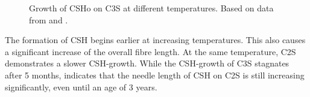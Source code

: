 \begin{figure}[!htb]
    \caption{Growth of \ac{CSHo} on \ac{C3S} at different temperatures. Based on data from \textcite{voland.2000} and \textcite{suss.2001}.}
    \label{fig:suess_CSH_C3S}
\end{figure}

\ifdefined\EXTERNALIZE
    \tikzexternalenable
\fi


The formation of \ac{CSH} begins earlier at increasing temperatures.
This also causes a significant increase of the overall fibre length.
At the same temperature, \ac{C2S} demonstrates a slower \ac{CSH}-growth.
While the \ac{CSH}-growth of \ac{C3S} stagnates after 5 months, \textcite{moser.2002} indicates that the needle length of \ac{CSH} on \ac{C2S} is still increasing significantly, even until an age of 3 years.

